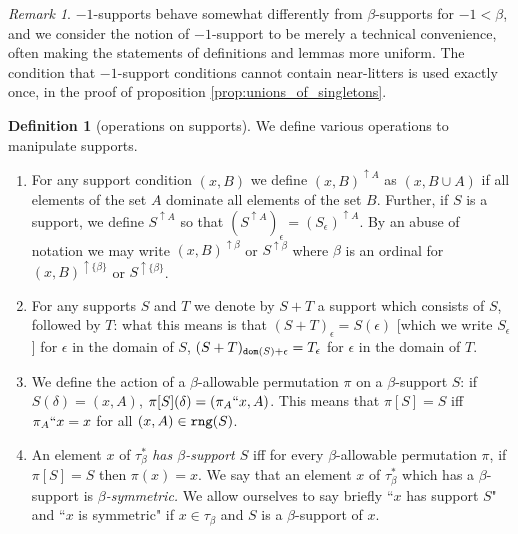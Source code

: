 \documentclass{article}
\theoremstyle{definition}
\newtheorem{definition}[theorem]{Definition}
\theoremstyle{remark}
\newtheorem{remark}[theorem]{Remark}
\begin{document}
{
\begin{remark}
 $-1$-supports behave somewhat differently from $\beta$-supports for $-1 < \beta$, and we consider the notion of $-1$-support to be merely a technical convenience, often making the statements of definitions and lemmas more uniform.
  The condition that $-1$-support conditions cannot contain near-litters is used exactly once, in the proof of proposition \ref{prop:unions_of_singletons}.
\end{remark}
}



\begin{definition}[operations on supports]\label{def:support_operations}
{We define various operations to manipulate supports.}
\begin{enumerate}
\item For any support condition $(x,B)$ we define $(x,B)^{\uparrow A}$ as $(x,B\cup A)$ if all elements of the set $A$ dominate all elements of the set $B$.
Further, if $S$ is a support, we define $S^{\uparrow A}$ so that $(S^{\uparrow A})_\epsilon = (S_\epsilon)^{\uparrow A}$.  By an abuse of notation we may write $(x,B)^{\uparrow \beta}$ or $S^{\uparrow \beta}$ where $\beta$ is an ordinal for $(x,B)^{\uparrow \{\beta\}}$ or $S^{\uparrow \{\beta\}}$.

\item For any supports $S$ and $T$ we denote by $S+T$ a support which consists
of $S$, followed by $T$:  what this means is that $(S+T)_\epsilon = S(\epsilon)$ [which we write $S_\epsilon$] for $\epsilon$ in the domain of $S$, $(S+T)_{{\tt dom}(S)+\epsilon} = T_\epsilon$ for $\epsilon$ in the domain of $T$.

\item We define the action of a $\beta$-allowable permutation $\pi$ on a $\beta$-support $S$:  if $S(\delta) = (x,A)$, $\pi[S](\delta) = (\pi_A``x,A)$.
{This means that $\pi[S] = S$ iff $\pi_A``x = x$ for all $(x,A) \in {\tt rng}(S)$.}

\item
An element $x$ of $\tau^*_\beta$ {\em has $\beta$-support $S$\/} iff for every $\beta$-allowable permutation $\pi$, if $\pi[S] = S$ then $\pi(x)=x$.  We say that  an element $x$ of $\tau^*_\beta$ which has a $\beta$-support is {\em $\beta$-symmetric.}  We allow ourselves to say briefly ``$x$ has support $S$" and ``$x$ is symmetric" if $x \in \tau_\beta$ and $S$ is a $\beta$-support of $x$.
\end{enumerate}
\end{definition}
\end{document}
